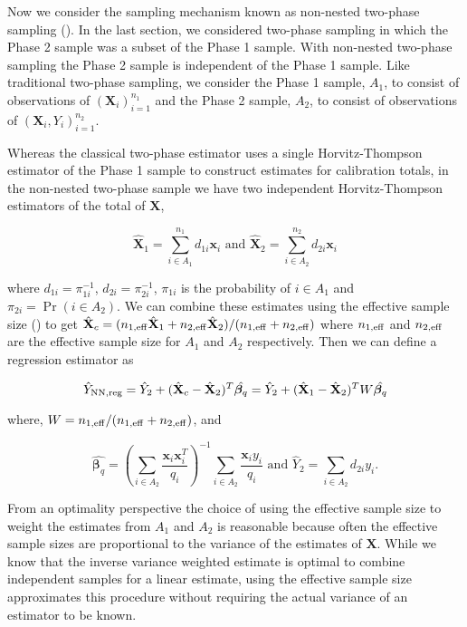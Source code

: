 \documentclass[12pt]{article}
\renewcommand{\bf}[1]{\mathbf{#1}}
\begin{document}
Now we consider the sampling mechanism known as non-nested two-phase sampling 
(\cite{hidiroglou2001double}). In the last section, we considered two-phase sampling
in which the Phase 2 sample was a subset of the Phase 1 sample. With non-nested
two-phase sampling the Phase 2 sample is independent of the Phase 1 sample. 
Like traditional two-phase sampling, we consider the Phase 1 sample, $A_1$, to
consist of observations of $(\bf X_i)_{i = 1}^{n_1}$ and the Phase 2 sample,
$A_2$, to consist of observations of $(\bf X_i, Y_i)_{i = 1}^{n_2}$. 

Whereas the classical two-phase estimator uses a single Horvitz-Thompson
estimator of the Phase 1 sample to construct estimates for calibration totals,
in the non-nested two-phase sample we have two independent Horvitz-Thompson
estimators of the total of $\bf X$,

$$\hat{\bf X}_1 = \sum_{i \in A_1}^{n_1} d_{1i} \bf x_i \text{ and } 
\hat{\bf X}_2 = \sum_{i \in A_2}^{n_2} d_{2i} \bf x_i $$

where $d_{1i} = \pi_{1i}^{-1}$, $d_{2i} = \pi_{2i}^{-1}$, $\pi_{1i}$ is the
probability of $i \in A_1$ and $\pi_{2i} = \Pr(i \in A_2)$. 
We can combine these estimates using the effective sample size 
(\cite{kish1965survey}) to get
$\hat{\bf X}_c = (n_{1, \rm{eff}} \hat{\bf X}_1 + n_{2, \rm{eff}}\hat{\bf X}_2) / 
(n_{1, \rm{eff}} + n_{2, \rm{eff}})$ where $n_{1, \rm{eff}}$ and 
$n_{2, \rm{eff}}$ are the effective sample size for $A_1$ and $A_2$ respectively.
Then we can define a regression estimator as

$$
\hat Y_{\rm NN, reg} = \hat Y_2 + (\hat{\bf X}_c - \hat{\bf X}_2)^T \hat{\bm \beta_q} = 
\hat Y_2 + (\hat{\bf X}_1 - \hat{\bf X}_2)^T W\hat{\bm \beta_q}
$$

where, $W = n_{1, \rm{eff}} / (n_{1, \rm{eff}} + n_{2, \rm{eff}})$, and

$$
\hat{\bm \beta_q} = 
\left(\sum_{i \in A_2} \frac{\bf x_i \bf x_i^T}{q_i}\right)^{-1} 
\sum_{i \in A_2} \frac{\bf x_i y_i}{q_i} \text{ and }
\hat Y_2 = \sum_{i \in A_2} d_{2i} y_i.
$$

From an optimality perspective the choice of using the effective sample size to
weight the estimates from $A_1$ and $A_2$ is reasonable because often the
effective sample sizes are proportional to the variance of the estimates 
of $\bf X$. While we know that the inverse variance weighted estimate is optimal
to combine independent samples for a linear estimate, using the effective sample
size approximates this procedure without requiring the actual variance of an
estimator to be known.
\end{document}
